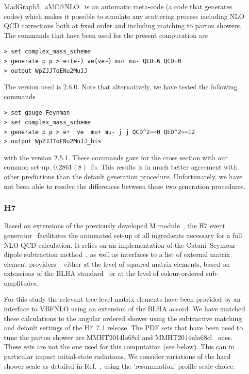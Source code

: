 \documentclass[11pt]{cernrep}
\newcommand{\Herwig}{H\protect\scalebox{0.8}{ERWIG}7\xspace}
\newcommand{\Matchbox}{M\protect\scalebox{0.8}{ATCHBOX}\xspace}
\begin{document}
{\sc MadGraph5\_aMC@NLO}~\cite{Alwall:2014hca} is an automatic meta-code (a code that generates codes) which makes it possible to simulate any scattering process
      including NLO QCD corrections both at fixed order and including matching to parton showers. 
      The commands that have been used for the present computation are
\begin{verbatim}
> set complex_mass_scheme
> generate p p > e+(e-) ve(ve~) mu+ mu- QED=6 QCD=0
> output WpZJJToENu2MuJJ
\end{verbatim}
  The version used is 2.6.0.
  Note that alternatively, we have tested the following commands
  \begin{verbatim}
> set gauge Feynman
> set complex_mass_scheme
> generate p p > e+  ve  mu+ mu- j j QCD^2==0 QED^2==12
> output WpZJJToENu2MuJJ_bis
\end{verbatim}
  with the version 2.5.1.
  These commands gave for the cross section with our common set-up: $0.2861(8)$~fb.
  This results is in much better agreement with other predictions than the default generation procedure.
  Unfortunately, we have not been able to resolve the differences between these two generation procedures.
  
\subsubsection*{\protect\Herwig \label{vbs_herwig}}

Based on extensions of the previously developed \Matchbox
module~\cite{Platzer:2011bc}, the \Herwig event generator~\cite{Bellm:2015jjp,Bahr:2008pv} facilitates the automated set-up of all ingredients necessary for a full NLO QCD calculation.
It relies on an implementation of the Catani--Seymour dipole
subtraction method~\cite{Catani:1996vz,Catani:2002hc}, as well as
interfaces to a list of external matrix element providers -- either
at the level of squared matrix elements, based on extensions of the
BLHA standard~\cite{Binoth:2010xt,Alioli:2013nda,Andersen:2014efa} or
at the level of colour-ordered sub-amplitudes.

For this study the relevant tree-level matrix elements have been
provided by an interface to VBFNLO \cite{Arnold:2008rz,Arnold:2011wj,Baglio:2014uba} using an extension of the BLHA
accord. We have matched these calculations to the angular ordered
shower using the subtractive matching and default settings of the
\Herwig~7.1 release. The PDF sets that have been used to tune the parton shower are MMHT2014lo68cl and
MMHT2014nlo68cl~\cite{Harland-Lang:2014zoa} ones.
These sets are not the one used for this computation (see below).
This can in particular impact initial-state radiations.
We consider variations of the hard shower scale as detailed in Ref.~\cite{Bellm:2016rhh}, using the 'resummation' profile scale choice.
\end{document}

